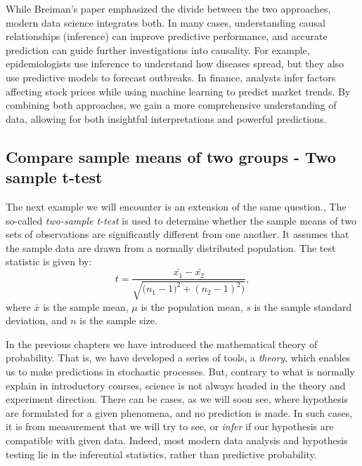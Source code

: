 \documentclass{book}
\begin{document}
While Breiman’s paper emphasized the divide between the two approaches, modern data science integrates both. In many cases, understanding causal relationships (inference) can improve predictive performance, and accurate prediction can guide further investigations into causality. For example, epidemiologists use inference to understand how diseases spread, but they also use predictive models to forecast outbreaks. In finance, analysts infer factors affecting stock prices while using machine learning to predict market trends. By combining both approaches, we gain a more comprehensive understanding of data, allowing for both insightful interpretations and powerful predictions.

\newpage
\subsection{Compare sample means of two groups - Two sample t-test}

The next example we will encounter is an extension of the same question., The so-called \textit{two-sample t-test} is used to determine whether the sample means of two sets of observations are significantly different from one another. It assumes that the sample data are drawn from a normally distributed population. The test statistic is given by:
\[
    t = \frac{\bar{x_{1}} - \bar{x_{2}}}{\sqrt{\big(n_{1} - 1)^{2} + (n_{2} - 1)^{2}\big)}},
\]
where $\bar{x}$ is the sample mean, $\mu$ is the population mean, $s$ is the sample standard deviation, and $n$ is the sample size.

In the previous chapters we have introduced the mathematical theory of probability. That is, we have developed a series of tools, a \textit{theory}, which enables us to make predictions in stochastic processes. But, contrary to what is normally explain in introductory courses, science is not always headed in the theory and experiment direction. There can be cases, as we will soon see, where hypothesis are formulated for a given phenomena, and no prediction is made. In such cases, it is from measurement that we will try to see, or \textit{infer} if our hypothesis are compatible with given data. Indeed, most modern data analysis and hypothesis testing lie in the inferential statistics, rather than predictive probability.
\end{document}
